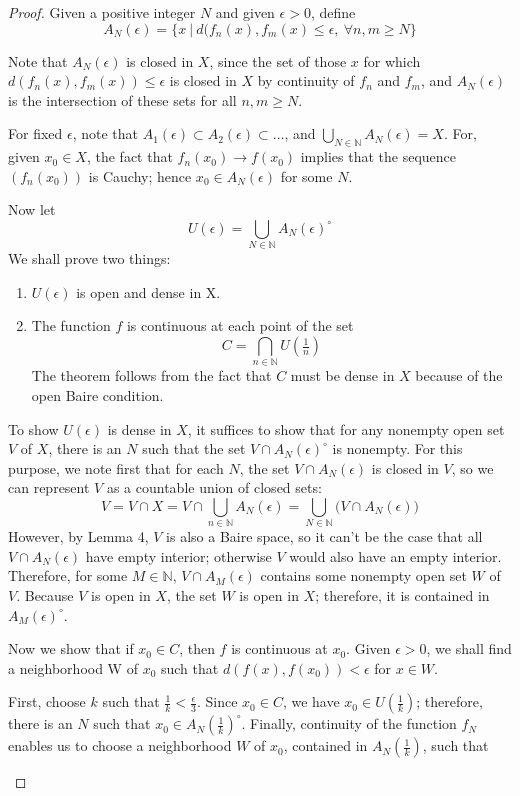 \documentclass[12pt]{article}
\newcommand{\mbN}{\mathbb{N}}
\begin{document}
\begin{proof}
	Given a positive integer $N$ and given $\epsilon>0$, define
	\[ A_N(\epsilon)=\{x\ |\ d(f_n(x),f_m(x)\leq \epsilon,\ \forall n,m\geq N\}
	\]
	
Note that $A_N(\epsilon)$ is closed in $X$, since the set of those $x$ for which $d(f_n(x),f_m(x))\leq \epsilon$ is closed in $X$ by continuity of $f_n$ and $f_m$, and $A_N(\epsilon)$ is the intersection of these sets for all $n,m\geq N$. \par For fixed $\epsilon$, note that $A_1(\epsilon)\subset A_2(\epsilon) \subset \dots$, and $\bigcup_{N\in \mbN} A_N(\epsilon)=X$. For, given $x_0\in X$, the fact that $f_n(x_0)\rightarrow f(x_0)$ implies that the sequence $(f_n(x_0))$ is Cauchy; hence $x_0\in A_N(\epsilon)$ for some $N$. \par Now let \[ U(\epsilon)=\bigcup_{N\in \mbN} A_N(\epsilon)^{\circ}
\]
We shall prove two things:
\begin{enumerate}[(1)]
	\item $U(\epsilon)$ is open and dense in X.
	\item The function $f$ is continuous at each point of the set
	\[ C=\bigcap_{n\in \mbN}U(\tfrac{1}{n}) 
	\]
The theorem follows from the fact that $C$ must be dense in $X$ because of the open Baire condition. 
\end{enumerate}
\par To show $U(\epsilon)$ is dense in $X$, it suffices to show that for any nonempty open set $V$ of $X$, there is an $N$ such that the set $V\cap A_N(\epsilon)^{\circ}$ is nonempty. For this purpose, we note first that for each $N$, the set $V\cap A_N(\epsilon)$ is closed in $V$, so we can represent $V$ as a countable union of closed sets:
\[ V= V\cap X = V\cap \bigcup_{n\in \mbN}A_N(\epsilon)= \bigcup_{N\in \mbN} \bigg(V\cap A_N(\epsilon)\bigg)
\]
However, by Lemma 4, $V$ is also a Baire space, so it can't be the case that all $V\cap A_N(\epsilon)$ have empty interior; otherwise $V$ would also have an empty interior. Therefore, for some $M\in \mbN$, $V\cap A_M(\epsilon)$ contains some nonempty open set $W$ of $V$. Because $V$ is open in $X$, the set $W$ is open in $X$; therefore, it is contained in $A_M(\epsilon)^{\circ}$. 
\par Now we show that if $x_0\in C$, then $f$ is continuous at $x_0$. Given $\epsilon>0$, we shall find a neighborhood W of $x_0$ such that $d(f(x),f(x_0))<\epsilon$ for $x\in W$. 
\par First, choose $k$ such that $\frac{1}{k}<\frac{\epsilon}{3}$. Since $x_0\in C$, we have $x_0\in U(\frac{1}{k})$; therefore, there is an $N$ such that $x_0\in A_N(\frac{1}{k})^{\circ}$. Finally, continuity of the function $f_N$ enables us to choose a neighborhood $W$ of $x_0$, contained in $A_N(\frac{1}{k})$, such that \begin{enumerate}[i.]

\end{enumerate}
\end{proof}
\end{document}
